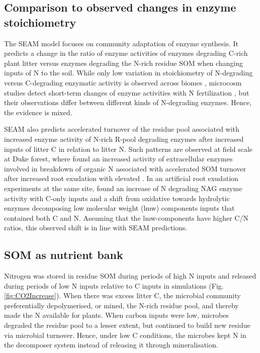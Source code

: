 \subsection{Comparison to observed changes in enzyme stoichiometry}
 
The SEAM model focuses on community adaptation of enzyme synthesis. It predicts
a change in the ratio of enzyme activities of enzymes degrading C-rich plant
litter versus enzymes degrading the N-rich residue SOM when changing inputs of
 N to the soil. 
While only low variation in stoichiometry of N-degrading versus C-degrading
enzymatic activity is observed across biomes \citep{Sinsabaugh09}, microcosm
studies detect short-term changes of enzyme activities with N fertilization
\citep{Kumar16}, but their observations differ between different kinds of
N-degrading enzymes. Hence, the evidence is mixed.

SEAM also predicts accelerated turnover of the residue pool associated with
increased enzyme activity of N-rich R-pool degrading enzymes after increased
inputs of litter C in relation to litter N.
Such patterns are observed at field scale at Duke forest, where
\citet{Phillips11} found an increased activity of extracellular enzymes involved
in breakdown of organic N associated with accelerated SOM turnover after
increased root exudation with elevated . In an artificial
root exudation experiments at the same site, \citet{Drake13} found an increase of N
degrading NAG enzyme activity with C-only inputs and a shift from oxidative
towards hydrolytic enzymes decomposing low molecular weight (lmw) components
inputs that contained both C and N.
Assuming that the lmw-components have higher C/N ratios, this observed shift
is in line with SEAM predictions.

\subsection{SOM as nutrient bank}
Nitrogen was stored in residue SOM during periods of high N inputs and released
during periods of low N inputs relative to C inputs in simulations (Fig.
\ref{fig:CO2Increase}). When there was excess litter C, the microbial
community preferentially depolymerised, or mined, the N-rich residue pool, and thereby
made the N available for plants. When carbon inputs were low, microbes degraded
the residue pool to a lesser extent, but continued to build new residue via
microbial turnover. Hence, under low C conditions, the microbes kept N in the
decomposer system instead of releasing it through mineralisation.

